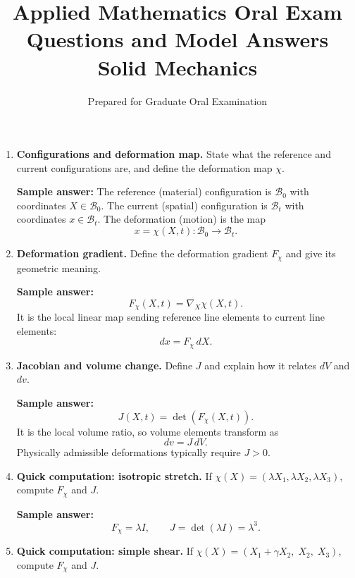 \documentclass[12pt]{article}
\title{\vspace{-2em}\textbf{Applied Mathematics Oral Exam Questions and Model Answers}\\
\large Solid Mechanics}
\author{Prepared for Graduate Oral Examination}
\date{}
\begin{document}
\maketitle

\begin{enumerate}

\item \textbf{Configurations and deformation map.}
State what the reference and current configurations are, and define the deformation map $\chi$.

\textbf{Sample answer:}
The reference (material) configuration is $\mathcal{B}_0$ with coordinates $X\in\mathcal{B}_0$.
The current (spatial) configuration is $\mathcal{B}_t$ with coordinates $x\in\mathcal{B}_t$.
The deformation (motion) is the map
\[
x=\chi(X,t):\mathcal{B}_0\to\mathcal{B}_t.
\]

\item \textbf{Deformation gradient.}
Define the deformation gradient $F_\chi$ and give its geometric meaning.

\textbf{Sample answer:}
\[
F_\chi(X,t)=\nabla_X \chi(X,t).
\]
It is the local linear map sending reference line elements to current line elements:
\[
dx = F_\chi\, dX.
\]

\item \textbf{Jacobian and volume change.}
Define $J$ and explain how it relates $dV$ and $dv$.

\textbf{Sample answer:}
\[
J(X,t)=\det(F_\chi(X,t)).
\]
It is the local volume ratio, so volume elements transform as
\[
dv = J\, dV.
\]
Physically admissible deformations typically require $J>0$.

\item \textbf{Quick computation: isotropic stretch.}
If $\chi(X)=(\lambda X_1,\lambda X_2,\lambda X_3)$, compute $F_\chi$ and $J$.

\textbf{Sample answer:}
\[
F_\chi=\lambda I,\qquad J=\det(\lambda I)=\lambda^3.
\]

\item \textbf{Quick computation: simple shear.}
If $\chi(X)=(X_1+\gamma X_2,\;X_2,\;X_3)$, compute $F_\chi$ and $J$.


\end{enumerate}
\end{document}
